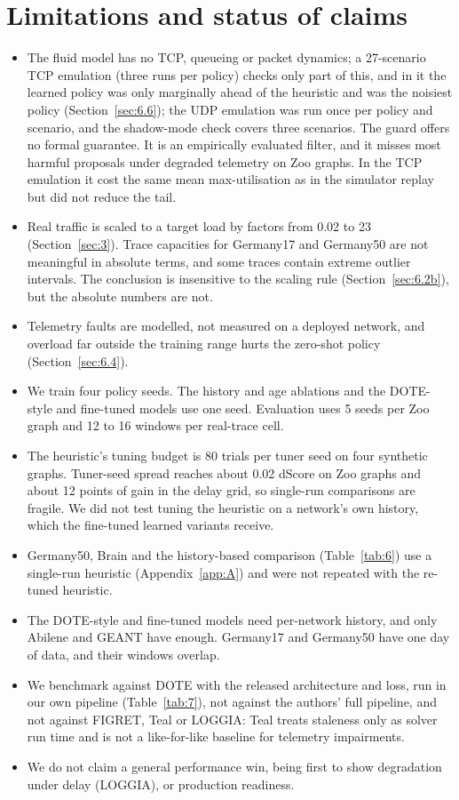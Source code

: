 \documentclass[journal]{IEEEtran}
\begin{document}
\section{Limitations and status of claims}
\label{sec:8}
\begin{itemize}
\item The fluid model has no TCP, queueing or packet dynamics; a 27-scenario TCP emulation (three runs per policy) checks only part of this, and in it the learned policy was only marginally ahead of the heuristic and was the noisiest policy (Section~\ref{sec:6.6}); the UDP emulation was run once per policy and scenario, and the shadow-mode check covers three scenarios. The guard offers no formal guarantee. It is an empirically evaluated filter, and it misses most harmful proposals under degraded telemetry on Zoo graphs. In the TCP emulation it cost the same mean max-utilisation as in the simulator replay but did not reduce the tail.
\item Real traffic is scaled to a target load by factors from 0.02 to 23 (Section~\ref{sec:3}). Trace capacities for Germany17 and Germany50 are not meaningful in absolute terms, and some traces contain extreme outlier intervals. The conclusion is insensitive to the scaling rule (Section~\ref{sec:6.2b}), but the absolute numbers are not.
\item Telemetry faults are modelled, not measured on a deployed network, and overload far outside the training range hurts the zero-shot policy (Section~\ref{sec:6.4}).
\item We train four policy seeds. The history and age ablations and the DOTE-style and fine-tuned models use one seed. Evaluation uses 5 seeds per Zoo graph and 12 to 16 windows per real-trace cell.
\item The heuristic's tuning budget is 80 trials per tuner seed on four synthetic graphs. Tuner-seed spread reaches about 0.02 dScore on Zoo graphs and about 12 points of gain in the delay grid, so single-run comparisons are fragile. We did not test tuning the heuristic on a network's own history, which the fine-tuned learned variants receive.
\item Germany50, Brain and the history-based comparison (Table~\ref{tab:6}) use a single-run heuristic (Appendix~\ref{app:A}) and were not repeated with the re-tuned heuristic.
\item The DOTE-style and fine-tuned models need per-network history, and only Abilene and GEANT have enough. Germany17 and Germany50 have one day of data, and their windows overlap.
\item We benchmark against DOTE with the released architecture and loss, run in our own pipeline (Table~\ref{tab:7}), not against the authors' full pipeline, and not against FIGRET, Teal or LOGGIA: Teal treats staleness only as solver run time and is not a like-for-like baseline for telemetry impairments.
\item We do not claim a general performance win, being first to show degradation under delay (LOGGIA), or production readiness.
\end{itemize}
\end{document}
